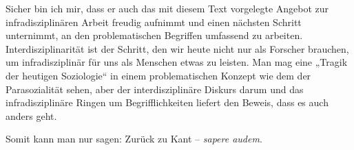 \documentclass[a4paper,11pt]{article}
\begin{document}
Sicher bin ich mir, dass er auch das mit diesem Text vorgelegte Angebot zur
infradisziplinären Arbeit freudig aufnimmt und einen nächsten Schritt
unternimmt, an den problematischen Begriffen umfassend zu
arbeiten. Interdisziplinarität ist der Schritt, den wir heute nicht nur als
Forscher brauchen, um infradisziplinär für uns als Menschen etwas zu
leisten. Man mag eine „Tragik der heutigen Soziologie“ in einem problematischen
Konzept wie dem der Parasozialität sehen, aber der interdisziplinäre Diskurs
darum und das infradisziplinäre Ringen um Begrifflichkeiten liefert den Beweis,
dass es auch anders geht.

Somit kann man nur sagen: Zurück zu Kant – \emph{sapere audem}.

\ccnotice
\end{document}
